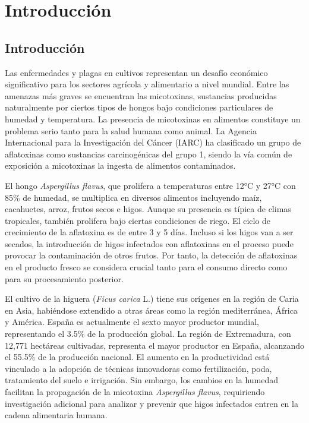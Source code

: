 \chapter{Introducción}
\section{Introducción}
Las enfermedades y plagas en cultivos representan un desafío económico significativo para los sectores agrícola y alimentario a nivel mundial. Entre las amenazas más graves se encuentran las micotoxinas, sustancias producidas naturalmente por ciertos tipos de hongos bajo condiciones particulares de humedad y temperatura. La presencia de micotoxinas en alimentos constituye un problema serio tanto para la salud humana como animal. La Agencia Internacional para la Investigación del Cáncer (IARC) ha clasificado un grupo de aflatoxinas como sustancias carcinogénicas del grupo 1, siendo la vía común de exposición a micotoxinas la ingesta de alimentos contaminados.

\vspace{5mm}

El hongo \textit{Aspergillus flavus}, que prolifera a temperaturas entre 12°C y 27°C con 85\% de humedad, se multiplica en diversos alimentos incluyendo maíz, cacahuetes, arroz, frutos secos e higos. Aunque su presencia es típica de climas tropicales, también prolifera bajo ciertas condiciones de riego. El ciclo de crecimiento de la aflatoxina es de entre 3 y 5 días. Incluso si los higos van a ser secados, la introducción de higos infectados con aflatoxinas en el proceso puede provocar la contaminación de otros frutos. Por tanto, la detección de aflatoxinas en el producto fresco se considera crucial tanto para el consumo directo como para su procesamiento posterior.

\vspace{5mm}

El cultivo de la higuera (\textit{Ficus carica} L.) tiene sus orígenes en la región de Caria en Asia, habiéndose extendido a otras áreas como la región mediterránea, África y América. España es actualmente el sexto mayor productor mundial, representando el 3.5\% de la producción global. La región de Extremadura, con 12,771 hectáreas cultivadas, representa el mayor productor en España, alcanzando el 55.5\% de la producción nacional. El aumento en la productividad está vinculado a la adopción de técnicas innovadoras como fertilización, poda, tratamiento del suelo e irrigación. Sin embargo, los cambios en la humedad facilitan la propagación de la micotoxina \textit{Aspergillus flavus}, requiriendo investigación adicional para analizar y prevenir que higos infectados entren en la cadena alimentaria humana.

